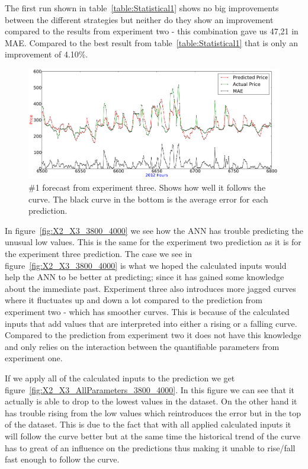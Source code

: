 The first run shown in table~\ref{table:Statistical1} shows no big improvements between the different strategies but neither do they show an improvement compared to the results from experiment two - this combination gave us 47,21 in MAE. Compared to the best result from table~\ref{table:Statistical1} that is only an improvement of 4.10\%.

\begin{figure}[H]
\centering
\includegraphics[width=\linewidth]{billeder/PriceExperimentalAnalysis/X3_Nr1_Best_skew_historical.png}
\caption{\#1 forecast from experiment three. Shows how well it follows the curve. The black curve in the bottom is the average error for each prediction.}
\label{fig:X3_Best_With_MAE}
\end{figure}

In figure~\ref{fig:X2_X3_3800_4000} we see how the ANN has trouble predicting the unusual low values. This is the same for the experiment two prediction as it is for the experiment three prediction. The case we see in figure~\ref{fig:X2_X3_3800_4000} is what we hoped the calculated inputs would help the ANN to be better at predicting; since it has gained some knowledge about the immediate past. Experiment three also introduces more jagged curves where it fluctuates up and down a lot compared to the prediction from experiment two - which has smoother curves. This is because of the calculated inputs that add values that are interpreted into either a rising or a falling curve. Compared to the prediction from experiment two it does not have this knowledge and only relies on the interaction between the quantifiable parameters from experiment one.

If we apply all of the calculated inputs to the prediction we get figure~\ref{fig:X2_X3_AllParameters_3800_4000}. In this figure we can see that it actually is able to drop to the lowest values in the dataset. On the other hand it has trouble rising from the low values which reintroduces the error but in the top of the dataset. This is due to the fact that with all applied calculated inputs it will follow the curve better but at the same time the historical trend of the curve has to great of an influence on the predictions thus making it unable to rise/fall fast enough to follow the curve.

